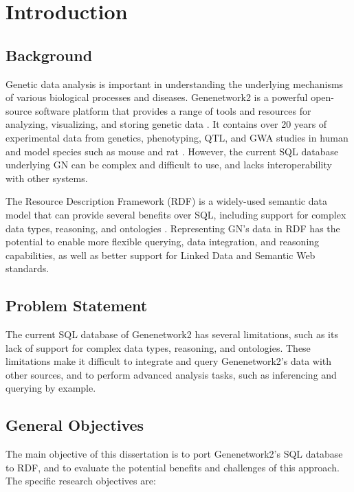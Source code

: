 \chapter{Introduction}

\section{Background}
Genetic data analysis is important in understanding the underlying mechanisms of various biological processes and diseases.  Genenetwork2 is a powerful open-source software platform that provides a range of tools and resources for analyzing, visualizing, and storing genetic data \citep{sloan2016genenetwork,mulligan2017genenetwork}.  It contains over 20 years of experimental data from genetics, phenotyping, QTL, and GWA studies in human and model species such as mouse and rat \citep{sloan2016genenetwork}.  However, the current SQL database underlying GN can be complex and difficult to use, and lacks interoperability with other systems.

The Resource Description Framework (RDF) is a widely-used semantic data model that can provide several benefits over SQL, including support for complex data types, reasoning, and ontologies \citep{candan2001resource}.  Representing GN's data in RDF has the potential to enable more flexible querying, data integration, and reasoning capabilities, as well as better support for Linked Data and Semantic Web standards.

\section{Problem Statement}

The current SQL database of Genenetwork2 has several limitations, such as its lack of support for complex data types, reasoning, and ontologies.  These limitations make it difficult to integrate and query Genenetwork2's data with other sources, and to perform advanced analysis tasks, such as inferencing and querying by example.

\section{General Objectives}

The main objective of this dissertation is to port Genenetwork2's SQL database to RDF, and to evaluate the potential benefits and challenges of this approach.  The specific research objectives are:

